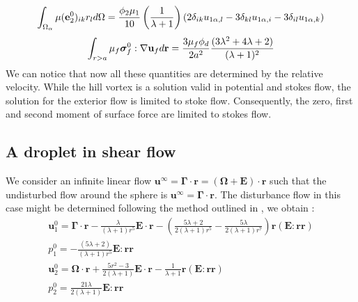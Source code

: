 \begin{equation*}
    \int_{\Omega_\alpha} \mu(\textbf{e}_2^0)_{ik} r_l d\Omega =
    \frac{\phi_2\mu_1}{10}\left(\frac{1}{\lambda+1}\right)
    \left(
        2\delta_{ik}u_{1 \alpha , l}
        -3\delta_{kl}u_{1 \alpha , i}
        -3\delta_{il}u_{1 \alpha , k}
    \right)
\end{equation*}
\begin{equation*}
    \int_{r>a} \mu_f \bm\sigma^0_f:\mathbf{\nabla} \textbf{u}_f  d\textbf{r}
    = 
    \frac{3\mu_f \phi_d}{2a^2}
    \frac{(3\lambda^2 + 4\lambda +2)}{(\lambda + 1)^2}
\end{equation*}
We can notice that now all these quantities are determined by the relative velocity.  
While the hill vortex is a solution valid in potential and stokes flow, the solution for the exterior flow is limited to stoke flow. 
Consequently, the zero, first and second moment of surface force are limited to stokes flow. 

\subsection{A droplet in shear flow}

We consider an infinite linear flow $\textbf{u}^\infty = \bm\Gamma\cdot \textbf{r} =(\bm\Omega + \textbf{E})\cdot \textbf{r} $ such that the undisturbed flow around the sphere is $\textbf{u}^\infty = \bm\Gamma\cdot\textbf{r}$.
The disturbance flow in this case might be determined following the method outlined in \citep{leal2007advanced}, we obtain  :
\begin{align*}
    \textbf{u}^0_1
    = \bm\Gamma\cdot\textbf{r}
    -\frac{\lambda}{(\lambda + 1)r^5} \textbf{E}\cdot\textbf{r}
    - \left(\frac{5\lambda +2}{2(\lambda +1 )r^5} - \frac{5\lambda}{2(\lambda+1)r^7}\right) \textbf{r}(\textbf{E}:\textbf{rr})\\
    p_1^0 
    = -\frac{(5\lambda+2)}{(\lambda+1)r^5}\textbf{E}:\textbf{rr}\\
    \textbf{u}^0_2
    = \bm\Omega\cdot\textbf{r}
    + \frac{5r^2- 3}{2(\lambda + 1)} 
    \textbf{E}\cdot\textbf{r}
    -\frac{1}{\lambda+1} \textbf{r}(\textbf{E}:\textbf{rr})\\
    p_2^0 
    = \frac{21\lambda}{2(\lambda+1)}
    \textbf{E}:\textbf{rr}
\end{align*}

